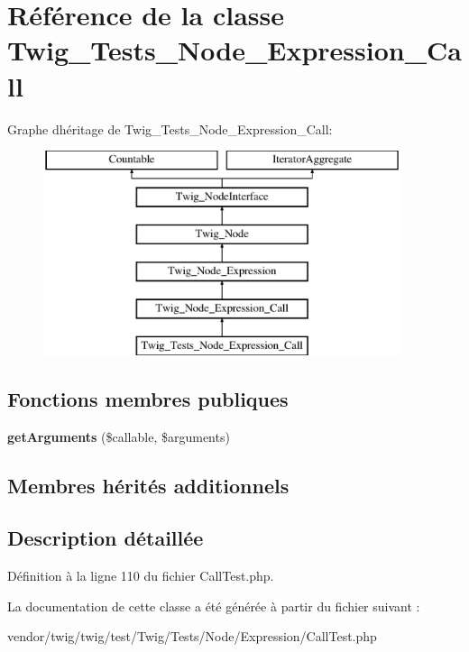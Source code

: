 \hypertarget{class_twig___tests___node___expression___call}{}\section{Référence de la classe Twig\+\_\+\+Tests\+\_\+\+Node\+\_\+\+Expression\+\_\+\+Call}
\label{class_twig___tests___node___expression___call}
Graphe d\textquotesingle{}héritage de Twig\+\_\+\+Tests\+\_\+\+Node\+\_\+\+Expression\+\_\+\+Call\+:\begin{figure}[H]
\begin{center}
\leavevmode
\includegraphics[height=6.000000cm]{class_twig___tests___node___expression___call}
\end{center}
\end{figure}
\subsection*{Fonctions membres publiques}
\begin{DoxyCompactItemize}
\item 
{\bfseries get\+Arguments} (\$callable, \$arguments)\hypertarget{class_twig___tests___node___expression___call_a3546f967ad32236268c7e2ef810b707a}{}\label{class_twig___tests___node___expression___call_a3546f967ad32236268c7e2ef810b707a}

\end{DoxyCompactItemize}
\subsection*{Membres hérités additionnels}


\subsection{Description détaillée}


Définition à la ligne 110 du fichier Call\+Test.\+php.



La documentation de cette classe a été générée à partir du fichier suivant \+:\begin{DoxyCompactItemize}
\item 
vendor/twig/twig/test/\+Twig/\+Tests/\+Node/\+Expression/Call\+Test.\+php\end{DoxyCompactItemize}
